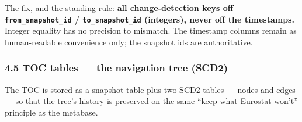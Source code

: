\documentclass[
]{article}
\begin{document}
The fix, and the standing rule: \textbf{all change-detection keys off
\texttt{from\_snapshot\_id} / \texttt{to\_snapshot\_id} (integers),
never off the timestamps.} Integer equality has no precision to
mismatch. The timestamp columns remain as human-readable convenience
only; the snapshot ids are authoritative.

\subsubsection{4.5 TOC tables --- the navigation tree
(SCD2)}\label{toc-tables-the-navigation-tree-scd2}

The TOC is stored as a snapshot table plus two SCD2 tables --- nodes and
edges --- so that the tree's history is preserved on the same ``keep
what Eurostat won't'' principle as the metabase.
\end{document}
